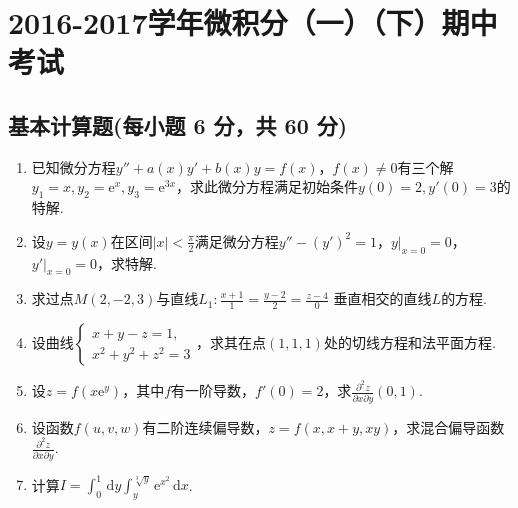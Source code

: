 \documentclass[../Main.tex]{subfiles}
\begin{document}
\chapter{2016-2017学年微积分（一）（下）期中考试}

\section{基本计算题(每小题 6 分，共 60 分)}
\begin{enumerate}
    \item 已知微分方程$y''+a(x)y'+b(x)y=f(x)$，$f(x)\neq0$有三个解$y_{1}=x,y_{2}
              =\mathrm{e}^{x},y_{3}=\mathrm{e}^{3x}$，求此微分方程满足初始条件$y(0)=2,y'(0)
              =3$的特解.
          \vspace{11em}

    \item 设$y=y(x)$在区间$|x|<\frac{\pi}{2}$满足微分方程$y''-(y')^{2}=1$，$y|_{x=0}
              =0$，$y'|_{x=0}=0$，求特解.
          \vspace{11em}

    \item 求过点$M(2,-2,3)$与直线$L_{1}:\frac{x+1}{1}=\frac{y-2}{2}=\frac{z-4}{0}$
          垂直相交的直线$L$的方程.
          \vspace{12em}

    \item 设曲线$\begin{cases}
                  x+y-z=1, \\
                  x^{2}+y^{2}+z^{2}=3
              \end{cases}$，求其在点$(1,1,1)$处的切线方程和法平面方程.
          \vspace{12em}

    \item 设$z=f(x\mathrm{e}^{y})$，其中$f$有一阶导数，$f'(0)=2$，求$\frac{\partial^{2}
                  z}{\partial x\partial y}(0,1)$.
          \vspace{12em}

    \item 设函数$f(u,v,w)$有二阶连续偏导数，$z=f(x,x+y,xy)$，求混合偏导函数$\frac{\partial^{2}
                  z}{\partial x\partial y}$.
          \vspace{12em}

    \item 计算$I=\int_{0}^{1}\,\mathrm{d}y\int_{y}^{\sqrt[3]{y}}\mathrm{e}^{x^{2}}\,\mathrm{d}x$.
          \vspace{12em}


\end{enumerate}
\end{document}
